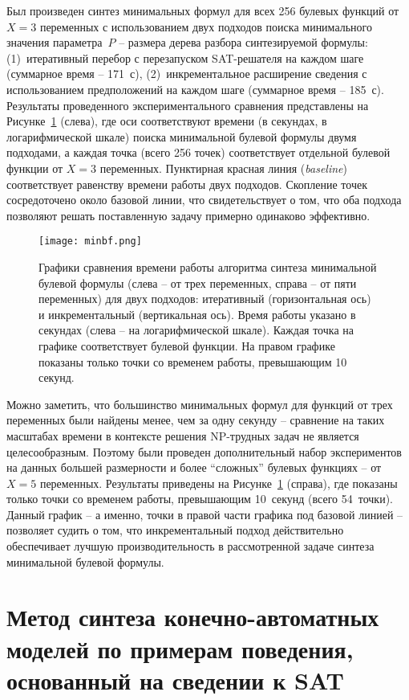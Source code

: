Был произведен синтез минимальных формул для всех 256 булевых функций от $X = 3$ переменных с использованием двух подходов поиска минимального значения параметра~$P$ \--- размера дерева разбора синтезируемой формулы: (1)~итеративный перебор с перезапуском SAT-решателя на каждом шаге (суммарное время \--- 171~с), (2)~инкрементальное расширение сведения с использованием предположений на каждом шаге (суммарное время \--- 185~с).
Результаты проведенного экспериментального сравнения представлены на Рисунке~\ref{fig:minbf} (слева), где оси соответствуют времени (в секундах, в логарифмической шкале) поиска минимальной булевой формулы двумя подходами, а каждая точка (всего 256 точек) соответствует отдельной булевой функции от $X = 3$ переменных.
Пунктирная красная линия (\textit{baseline}) соответствует равенству времени работы двух подходов.
Скопление точек сосредоточено около базовой линии, что свидетельствует о том, что оба подхода позволяют решать поставленную задачу примерно одинаково эффективно.

\begin{figure}[!t]
    \centering
    \texttt{[image: minbf.png]}
    \caption{Графики сравнения времени работы алгоритма синтеза минимальной булевой формулы (слева \--- от трех переменных, справа \--- от пяти переменных) для двух подходов: итеративный (горизонтальная ось) и инкрементальный (вертикальная ось). Время работы указано в секундах (слева \--- на логарифмической шкале). Каждая точка на графике соответствует булевой функции. На правом графике показаны только точки со временем работы, превышающим 10 секунд.}
    \label{fig:minbf}
\end{figure}

Можно заметить, что большинство минимальных формул для функций от трех переменных были найдены менее, чем за одну секунду \--- сравнение на таких масштабах времени в контексте решения NP-трудных задач не является целесообразным.
Поэтому были проведен дополнительный набор экспериментов на данных большей размерности и более \enquote{сложных} булевых функциях \--- от $X = 5$ переменных.
Результаты приведены на Рисунке~\ref{fig:minbf} (справа), где показаны только точки со временем работы, превышающим 10~секунд (всего 54~точки).
Данный график \--- а именно, точки в правой части графика под базовой линией \--- позволяет судить о том, что инкрементальный подход действительно обеспечивает лучшую производительность в рассмотренной задаче синтеза минимальной булевой формулы.


\section{Метод синтеза конечно-автоматных моделей по примерам поведения, основанный на сведении к SAT}
\label{sec:automata-synthesis}

